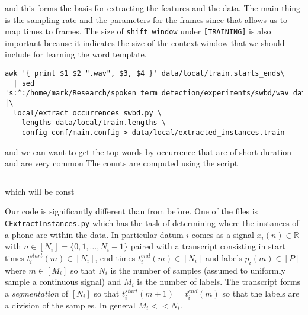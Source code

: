 \documentclass{article}
\begin{document}
and this forms the basis for extracting the features
and the data.
The main thing is the sampling rate and the parameters for the
frames since that allows us to map times to frames.  The size of
\texttt{shift\_window} under \texttt{[TRAINING]} is also important
because it indicates the size of the context window that we
should include for learning the word template.
\begin{verbatim}
awk '{ print $1 $2 ".wav", $3, $4 }' data/local/train.starts_ends\
  | sed 's:^:/home/mark/Research/spoken_term_detection/experiments/swbd/wav_data/:' |\
  local/extract_occurrences_swbd.py \
  --lengths data/local/train.lengths \
  --config conf/main.config > data/local/extracted_instances.train
\end{verbatim}


and we can 
want to get the top words by occurrence that are
of short duration and are very common
 The counts are computed
using the script
\begin{verbatim}

\end{verbatim}
which will be const


Our code is significantly different than from before.  One of the files is \texttt{CExtractInstances.py}
which has the task of determining where the instances of a phone are within the data. In particular datum $i$ comes as 
a signal $x_i(n)\in\mathbb{R}$ with $n\in[N_i]=\{0,1,\ldots,N_i-1\}$ paired with a transcript consisting in start times $t_i^{start}(m)\in[N_i]$,
end times $t_i^{end}(m)\in[N_i]$ and labels $p_i(m)\in [P]$ where $m\in[M_i]$ so that $N_i$ is the number of samples (assumed to 
uniformly sample a continuous signal) and $M_i$ is the number of labels.  The transcript forms a \textit{segmentation} of
$[N_i]$ so that $t_i^{start}(m+1)=t_i^{end}(m)$ so that the labels are a division of the samples.  In general $M_i << N_i$.
\end{document}
